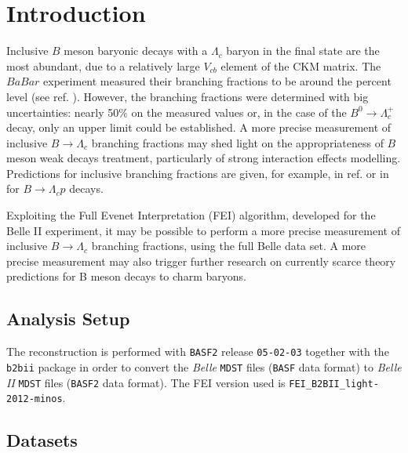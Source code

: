 
\chapter{Introduction}
\label{introduction}

 
 Inclusive $B$ meson baryonic decays with a $\Lambda_c$ baryon in the final state are the most abundant, due to a relatively large $V_{cb}$ element of the CKM matrix. The $BaBar$ experiment measured their branching fractions to be around the percent level (see ref. \cite{PhysRevD.75.072002}). 
However, the branching fractions were determined with big uncertainties: nearly 50$\%$ on the measured values or, in the case of the  $B^0 \rightarrow \Lambda_c^+$ decay, only an upper limit could be established. 
A more precise measurement of inclusive $B \rightarrow \Lambda_c$ branching fractions may shed light on the appropriateness of  $B$ meson weak decays treatment, particularly of strong
interaction effects modelling. Predictions for inclusive branching fractions are given, for example,
in ref. \cite{grach1997exclusive} or in \cite{Hsiao_2020}  for $B \rightarrow \Lambda_c p$ decays.

Exploiting the Full Evenet Interpretation (FEI) algorithm, developed for the Belle II experiment, it may be possible to perform a more precise measurement of inclusive $B \rightarrow \Lambda_c$ branching fractions, using the full Belle data set. A more precise measurement may also trigger further research on currently scarce theory predictions for B meson decays to charm baryons.

\section{Analysis Setup}

The reconstruction is performed with \texttt{BASF2} release \texttt{05-02-03} together with the 
\texttt{b2bii} package in order to convert the \textit{Belle} \texttt{MDST} files (\texttt{BASF} 
data format) to \textit{Belle II} \texttt{MDST} files (\texttt{BASF2} data format). 
The FEI version used is \texttt{FEI\_}\texttt{B2BII\_}\texttt{light-2012-minos}.

\section{Datasets}

